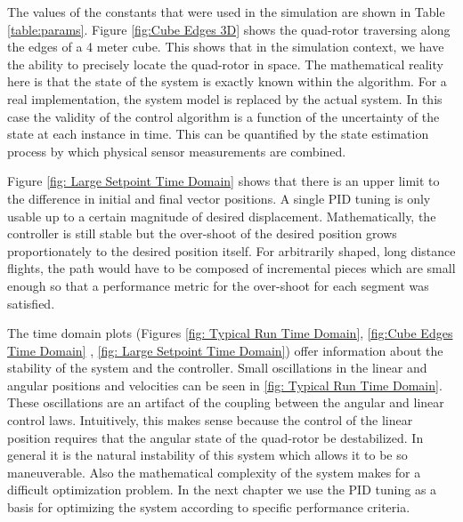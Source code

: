 The values of the constants that were used in the simulation are shown in Table \ref{table:params}. Figure \ref{fig:Cube Edges 3D} shows the quad-rotor traversing along the edges of a 4 meter cube. This shows that in the simulation context, we have the ability to precisely locate the quad-rotor in space. The mathematical reality here is that the state of the system is exactly known within the algorithm. For a real implementation, the system model is replaced by the actual system. In this case the validity of the control algorithm is a function of the uncertainty of the state at each instance in time. This can be quantified by the state estimation process by which physical sensor measurements are combined.

Figure \ref{fig: Large Setpoint Time Domain} shows that there is an upper limit to the difference in initial and final vector positions. A single PID tuning is only usable up to a certain magnitude of desired displacement. Mathematically, the controller is still stable but the over-shoot of the desired position grows proportionately to the desired position itself. For arbitrarily shaped, long distance flights, the path would have to be composed of incremental pieces which are small enough so that a performance metric for the over-shoot for each segment was satisfied.

The time domain plots (Figures     \ref{fig: Typical Run Time Domain},   \ref{fig:Cube Edges Time Domain}  , \ref{fig: Large Setpoint Time Domain}) offer information about the stability of the system and the controller. Small oscillations in the linear and angular positions and velocities can be seen in \ref{fig: Typical Run Time Domain}. These oscillations are an artifact of the coupling between the angular and linear control laws. Intuitively, this makes sense because the control of the linear position requires that the angular state of the quad-rotor be destabilized. In general it is the natural instability of this system which allows it to be so maneuverable. Also the mathematical complexity of the system makes for a difficult optimization problem. In the next chapter we use the PID tuning as a basis for optimizing the system according to specific performance criteria.

